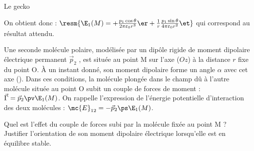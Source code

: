 \begin{exo}[PC][2][devoir]{Le gecko}
\begin{quest}
{On obtient donc : $\resm{\E_1(M)=+\frac{p_1\cos\theta}{2\pi\varepsilon_0 r^3} \er+\frac 1 r\frac{p_1 \sin\theta}{4\pi\varepsilon_0 r^2} \et}$ qui correspond au résultat attendu.
}
\end{quest}
Une seconde molécule polaire, modélisée par un dipôle rigide de moment dipolaire électrique
permanent $\Vec{p}_2$ , est située au point M sur l’axe ($Oz$) à la distance $r$ fixe du point O. À un instant donné, son moment dipolaire forme un angle $\alpha$ avec cet axe (). Dans ces conditions, la molécule plongée dans le champ
dû à l’autre molécule située au point O subit un couple de forces de moment : $\Vec{\Gamma}= \Vec{p}_2 \pv \E_1 ( M ) $. On rappelle l’expression de l’énergie
potentielle d’interaction des deux molécules : $\mc{E}_{12} = - \Vec{p}_2\ps\E_1 ( M )$.


\begin{quest}
  \question Quel est l’effet du couple de forces subi par la molécule fixée au point M ? Justifier l’orientation de son moment dipolaire électrique lorsqu’elle est en équilibre stable.
\end{quest}


\end{exo}
